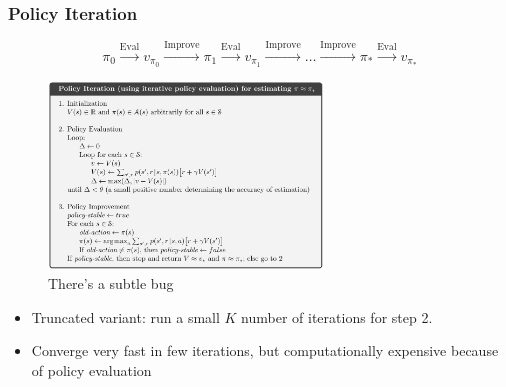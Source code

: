 \documentclass[10pt]{beamer}
\theoremstyle{remark}
\begin{document}
\begin{frame}
    \frametitle{Policy Iteration}
    \[
        \pi_0 \xrightarrow{\text{Eval} } v_{\pi_0} \xrightarrow{\text{Improve} } \pi_1 \xrightarrow{\text{Eval} } v_{\pi_1} \xrightarrow{\text{Improve}} \ldots  \xrightarrow{\text{Improve} } \pi_{\ast} \xrightarrow{\text{Eval} } v_{\pi_{\ast}}
    \] 
    \begin{figure}
        \includegraphics[width=0.65\textwidth]{figures/policy_iteration.png}
        \caption{There's a subtle bug}
    \end{figure}

    \begin{itemize}
        \item Truncated variant: run a small $K$ number of iterations for step 2.
        \item Converge very fast in few iterations, but computationally expensive because of policy evaluation
    \end{itemize}
\end{frame}

\end{document}
